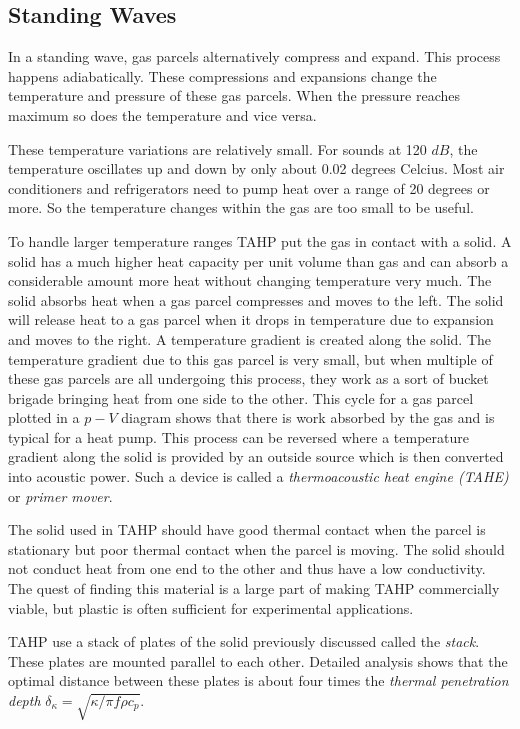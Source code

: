 \documentclass{article}
\newcommand{\newpara}
    {
      \bigbreak{}
      \noindent
    }
\begin{document}
\subsection{Standing Waves\cite{powerofsound,enginesandrefrigerators,tijaniLoudSpeaker}}
In a standing wave, gas parcels alternatively compress and expand. This process happens adiabatically. These compressions and expansions change the temperature and pressure of these gas parcels. When the pressure reaches maximum so does the temperature and vice versa.
\newpara{}
These temperature variations are relatively small. For sounds at 120 \(dB\), the temperature oscillates up and down by only about 0.02 degrees Celcius. Most air conditioners and refrigerators need to pump heat over a range of 20 degrees or more. So the temperature changes within the gas are too small to be useful.
\newpara{}
To handle larger temperature ranges TAHP put the gas in contact with a solid. A solid has a much higher heat capacity per unit volume than gas and can absorb a considerable amount more heat without changing temperature very much. The solid absorbs heat when a gas parcel compresses and moves to the left. The solid will release heat to a gas parcel when it drops in temperature due to expansion and moves to the right. A temperature gradient is created along the solid. The temperature gradient due to this gas parcel is very small, but when multiple of these gas parcels are all undergoing this process, they work as a sort of bucket brigade bringing heat from one side to the other. %
This cycle for a gas parcel plotted in a \(p-V\) diagram shows that there is work absorbed by the gas and is typical for a heat pump.  %
This process can be reversed where a temperature gradient along the solid is provided by an outside source which is then converted into acoustic power. Such a device is called a \emph{thermoacoustic heat engine (TAHE)} or \emph{primer mover}.
\newpara{}
The solid used in TAHP should have good thermal contact when the parcel is stationary but poor thermal contact when the parcel is moving. The solid should not conduct heat from one end to the other and thus have a low conductivity. The quest of finding this material is a large part of making TAHP commercially viable, but plastic is often sufficient for experimental applications.
\newpara{}
TAHP use a stack of plates of the solid previously discussed called the \emph{stack}. These plates are mounted parallel to each other. Detailed analysis shows that the optimal distance between these plates is about four times the \emph{thermal penetration depth} \(\delta_\kappa = \sqrt{\kappa/\pi f \rho c_p}\). %
\end{document}
